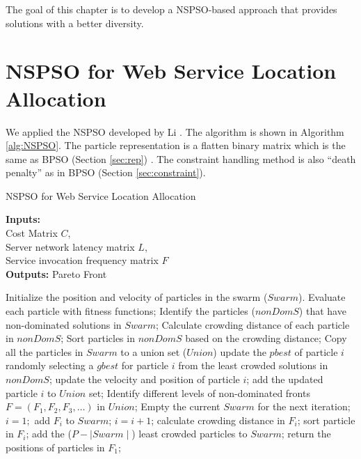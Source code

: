 The goal of this chapter is to develop a NSPSO-based approach that provides solutions with 
a better diversity.

\section{NSPSO for Web Service Location Allocation}
We applied the NSPSO developed by Li \cite{NSPSO}. The algorithm is shown in Algorithm \ref{alg:NSPSO}. 
The particle representation is a flatten binary matrix which is the same as BPSO (Section \ref{sec:rep}) .
The constraint handling method is also ``death penalty'' as in BPSO (Section \ref{sec:constraint}).


\begin{algorithm}[!h]
	\caption{NSPSO for Web Service Location Allocation}
	\footnotesize
	\textbf{Inputs:} \\
		Cost Matrix $C$, \\
		Server network latency matrix $L$, \\
		Service invocation frequency matrix $F$ \\

	\textbf{Outputs:}
		Pareto Front

	\begin{algorithmic}[1]
		\State Initialize the position and velocity of particles in the swarm ($Swarm$).
		\Repeat
			\State Evaluate each particle with fitness functions;
			\State Identify the particles ($nonDomS$) that have non-dominated solutions in $Swarm$;
			\State Calculate crowding distance of each particle in $nonDomS$;
			\State Sort particles in $nonDomS$ based on the crowding distance;
			\State Copy all the particles in $Swarm$ to a union set ($Union$)
			  \State update the $pbest$ of particle $i$
			  \State randomly selecting a $gbest$ for particle $i$ from the least crowded solutions in $nonDomS$;
			  \State update the velocity and position of particle $i$;
			  \State add the updated particle $i$ to $Union$ set;
			\EndFor
		\State Identify different levels of non-dominated fronts $F = (F_1, F_2, F_3, \dots)$ in $Union$;
		\State Empty the current $Swarm$ for the next iteration;
		\State $i = 1;$
		    \State add $F_i$ to $Swarm$;
		    \State $i = i + 1$;
		  \EndIf
		    \State calculate crowding distance in $F_i$;
		    \State sort particle in $F_i$;
		    \State add the ($P - \mid Swarm \mid$) least crowded particles to $Swarm$;
		  \EndIf
		\EndWhile
		\State return the positions of particles in $F_1$;
	\end{algorithmic}
	\label{alg:NSPSO}
\end{algorithm}



